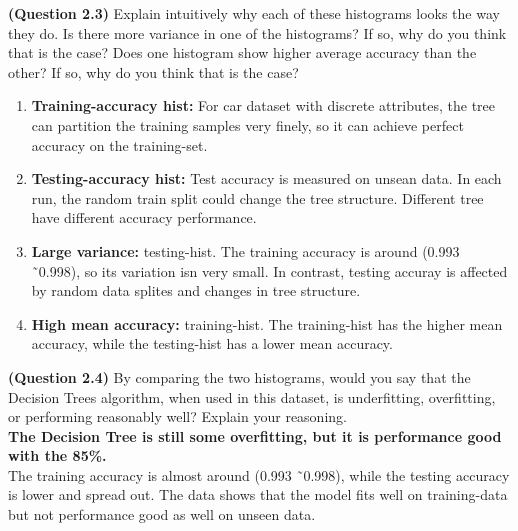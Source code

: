 \documentclass{article}
\begin{document}
    \item \textbf{(Question 2.3)} Explain intuitively why each of these histograms looks the way they do. Is there more variance in one of the histograms? If so, why do you think that is the case? Does one histogram show higher average accuracy than the other? If so, why do you think that is the case?
\begin{enumerate}
    \item \textbf{Training-accuracy hist:} For car dataset with discrete attributes, the tree can partition the training samples very finely, so it can achieve perfect accuracy on the training-set.
    \item \textbf{Testing-accuracy hist:} Test accuracy is measured on unsean data. In each run, the random train split could change the tree structure. Different tree have different accuracy performance.
    \item \textbf{Large variance: }testing-hist. The training accuracy is around (0.993 \~\ 0.998), so its variation isn very small. In contrast, testing accuray is affected by random data splites and changes in tree structure.
    \item \textbf{High mean accuracy: }training-hist. The training-hist has the higher mean accuracy, while the testing-hist has a lower mean accuracy.
\end{enumerate}



    \item \textbf{(Question 2.4)} By comparing the two histograms, would you say that the Decision Trees algorithm, when used in this dataset, is underfitting, overfitting, or performing reasonably well? Explain your reasoning.
\\
\textbf{The Decision Tree is still some overfitting, but it is performance good with the 85\%.}\\
The training accuracy is almost around (0.993 \~\ 0.998), while the testing accuracy is lower and spread out. The data shows that the model fits well on training-data but not performance good as well on unseen data.







    
\end{document}
